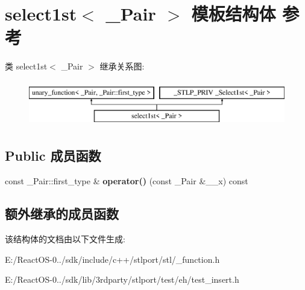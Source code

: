 \hypertarget{structselect1st}{}\section{select1st$<$ \+\_\+\+Pair $>$ 模板结构体 参考}
\label{structselect1st}
类 select1st$<$ \+\_\+\+Pair $>$ 继承关系图\+:\begin{figure}[H]
\begin{center}
\leavevmode
\includegraphics[height=2.000000cm]{structselect1st}
\end{center}
\end{figure}
\subsection*{Public 成员函数}
\begin{DoxyCompactItemize}
\item 
\mbox{\label{structselect1st_afe1bb2604fe235def5943c98724b7d32}} 
const \+\_\+\+Pair\+::first\+\_\+type \& {\bfseries operator()} (const \+\_\+\+Pair \&\+\_\+\+\_\+x) const
\end{DoxyCompactItemize}
\subsection*{额外继承的成员函数}


该结构体的文档由以下文件生成\+:\begin{DoxyCompactItemize}
\item 
E\+:/\+React\+O\+S-\/0../sdk/include/c++/stlport/stl/\+\_\+function.\+h\item 
E\+:/\+React\+O\+S-\/0../sdk/lib/3rdparty/stlport/test/eh/test\+\_\+insert.\+h\end{DoxyCompactItemize}
